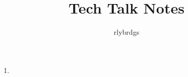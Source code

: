 \documentclass{article}
\title{Tech Talk Notes}
\author{rlybrdgs }
\begin{document}
\maketitle
\begin{enumerate}
    \item
\end{enumerate}
\end{document}
